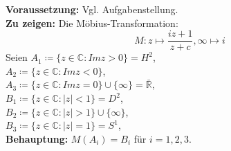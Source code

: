 \begin{problem}[4]
  \textbf{Voraussetzung:} Vgl. Aufgabenstellung. \\
  \textbf{Zu zeigen:} Die Möbius-Transformation:
  \begin{equation*}
    M: z \mapsto \frac{iz + 1}{z + c}, \infty \mapsto i
  \end{equation*}
  Seien \( A_1 \coloneqq \{ z \in \mathbb{C}: Im z > 0 \} = H^2 \), \\
  \( A_2 \coloneqq \{ z \in \mathbb{C}: Im z < 0 \} \),\\
  \( A_3 \coloneqq \{ z \in \mathbb{C}: Im z = 0 \} \cup \{ \infty \} = \bar{\mathbb{R}} \),\\
  \( B_1 \coloneqq \{ z \in \mathbb{C} : \vert z \vert < 1\} = D^2 \), \\
  \( B_2 \coloneqq \{ z \in \mathbb{C} : \vert z \vert > 1\} \cup \{ \infty \} \),\\
  \( B_3 \coloneqq \{ z \in \mathbb{C} : \vert z \vert = 1\} = S^1 \),\\
  \textbf{Behauptung:} \( M(A_i) = B_i \) für \( i = 1, 2, 3 \).
  

\end{problem}

